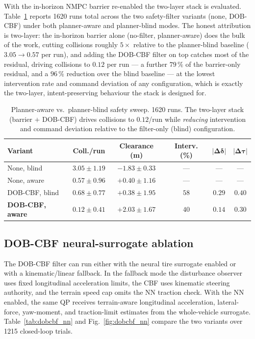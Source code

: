 \documentclass[conference,letterpaper,10pt]{IEEEtran}
\begin{document}
With the in-horizon NMPC barrier re-enabled the two-layer stack is
evaluated. Table~\ref{tab:safety_aware} reports 1620 runs total
across the two safety-filter variants (none, DOB-CBF) under both
planner-aware and planner-blind modes.
The honest attribution is two-layer: the in-horizon barrier alone
(no-filter, planner-aware) does the bulk of the work, cutting collisions
roughly $5\times$ relative to the planner-blind baseline ($3.05\!\to\!0.57$
per run), and adding the DOB-CBF filter on top catches most of the residual,
driving collisions to $0.12$ per run --- a further $79\,\%$ of the
barrier-only residual, and a $96\,\%$ reduction over the blind baseline ---
at the lowest intervention rate and command deviation of any configuration,
which is exactly the two-layer, intent-preserving behaviour the stack is
designed for.

\begin{table}[!t]
  \renewcommand{\arraystretch}{1.10}
  \caption{Planner-aware vs.\ planner-blind safety sweep. 1620 runs.
    The two-layer stack (barrier $+$ DOB-CBF) drives collisions to
    $0.12$/run while \emph{reducing} intervention and command deviation
    relative to the filter-only (blind) configuration.}
  \label{tab:safety_aware}
  \centering
  \setlength{\tabcolsep}{2pt}
  \footnotesize
  \begin{tabular}{lccccc}
    \toprule
    \textbf{Variant} & \textbf{Coll./run} & \textbf{Clearance (m)} & \textbf{Interv. (\%)} & $\mathbf{|\Delta\delta|}$ & $\mathbf{|\Delta\tau|}$\\
    \midrule
    None, blind          & $3.05\!\pm\!1.19$ & $-1.83\!\pm\!0.33$ & --- & --- & ---\\
    None, aware          & $0.57\!\pm\!0.96$ & $+0.40\!\pm\!1.16$ & --- & --- & ---\\
    DOB-CBF, blind       & $0.68\!\pm\!0.77$ & $+0.38\!\pm\!1.95$ & $58$ & $0.29$ & $0.40$\\
    \textbf{DOB-CBF, aware} & $\mathbf{0.12\!\pm\!0.41}$ & $\mathbf{+2.03\!\pm\!1.67}$ & $40$ & $0.14$ & $0.30$\\
    \bottomrule
  \end{tabular}
\end{table}


\subsection{DOB-CBF neural-surrogate ablation}
\label{sec:safety_dobcbf}

The DOB-CBF filter can run either with the neural tire surrogate
enabled or with a kinematic/linear fallback. In the fallback mode the
disturbance observer uses fixed longitudinal acceleration limits, the
CBF uses kinematic steering authority, and the terrain speed cap omits
the NN traction check. With the NN enabled, the same QP receives
terrain-aware longitudinal acceleration, lateral-force, yaw-moment,
and traction-limit estimates from the whole-vehicle surrogate.
Table~\ref{tab:dobcbf_nn} and Fig.~\ref{fig:dobcbf_nn} compare the
two variants over 1215 closed-loop trials.
\end{document}
